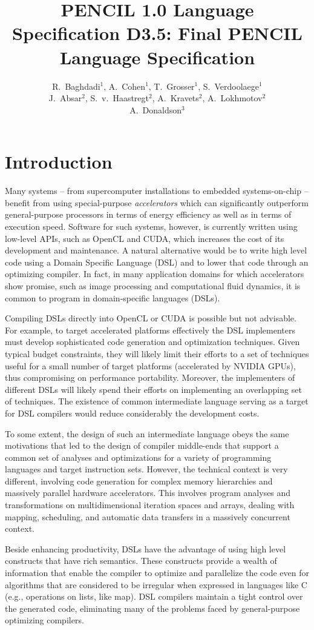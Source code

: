 \documentclass{carp}
\title{
\ifthenelse{\PublicDocument}
{PENCIL 1.0 Language Specification}
{D3.5: Final PENCIL Language Specification}
}
\author{R.\ Baghdadi$^1$, A.\ Cohen$^1$, T.\ Grosser$^1$, S.\ Verdoolaege$^1$ \\
  J.\ Absar$^2$, S.\ v.\ Haastregt$^2$, A.\ Kravets$^2$, A.\ Lokhmotov$^2$ \\
  A.\ Donaldson$^3$}
\begin{document}
\chapter{Introduction}

Many systems -- from supercomputer installations to embedded
systems-on-chip -- benefit from using special-purpose
{\em accelerators} which can significantly outperform general-purpose
processors in terms of energy efficiency as well as in terms of
execution speed.
Software for such systems, however, is currently written using
low-level APIs, such as OpenCL and CUDA, which increases the cost of
its development and maintenance.
A natural alternative would be to write high level code using a Domain
Specific Language (DSL) and to lower that code through an optimizing
compiler.
In fact, in many application domains for which accelerators show
promise, such as image processing and computational fluid dynamics, it
is common to program in domain-specific languages (DSLs).

Compiling DSLs directly into OpenCL or CUDA is possible but not
advisable.  For example, to target accelerated platforms effectively
the DSL implementers must develop sophisticated code generation and
optimization techniques.  Given typical budget constraints, they will
likely limit their efforts to a set of techniques useful for a small
number of target platforms (\eg accelerated by NVIDIA GPUs), thus
compromising on performance portability.  Moreover, the implementers
of different DSLs will likely spend their efforts on implementing an
overlapping set of techniques.
The existence of common intermediate language serving as a target
for DSL compilers would reduce considerably the development costs.

To some extent, the design of such an intermediate
language obeys the same motivations that led to the design of compiler
middle-ends that support a common set of analyses and optimizations
for a variety of programming languages and target instruction
sets. However, the technical context is very different, involving
code generation for complex memory hierarchies and massively parallel
hardware accelerators. This involves program analyses and
transformations on multidimensional iteration spaces and arrays,
dealing with mapping, scheduling, and automatic data transfers in a
massively concurrent context.

Beside enhancing productivity, DSLs have the advantage of using high level
constructs that have rich semantics.  These constructs provide a wealth of
information that enable the compiler to optimize and parallelize
the code even for algorithms that are considered to be irregular
when expressed in languages like C (e.g., operations on lists, like map).
%
DSL compilers maintain a tight control over the generated code, eliminating
many of the problems faced by general-purpose optimizing compilers.
\end{document}
